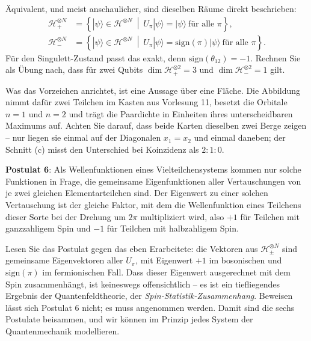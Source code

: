 Äquivalent, und meist anschaulicher, sind dieselben Räume direkt beschrieben:
\begin{align}
  \mathcal{H}^{\otimes N}_{+} &= \left\{|\psi\rangle \in \mathcal{H}^{\otimes N}\ \middle|\ U_\pi|\psi\rangle = |\psi\rangle\ \text{für alle $\pi$}\right\},\\
  \mathcal{H}^{\otimes N}_{-} &= \left\{|\psi\rangle \in \mathcal{H}^{\otimes N}\ \middle|\ U_\pi|\psi\rangle = \text{sign}(\pi)|\psi\rangle\ \text{für alle $\pi$}\right\}.
\end{align}
Für den Singulett-Zustand passt das exakt, denn $\text{sign}(\theta_{12}) = -1$. Rechnen Sie als Übung nach, dass für zwei Qubits $\dim \mathcal{H}^{\otimes 2}_{+} = 3$ und $\dim \mathcal{H}^{\otimes 2}_{-} = 1$ gilt.

Was das Vorzeichen anrichtet, ist eine Aussage über eine Fläche. Die Abbildung nimmt dafür zwei Teilchen im Kasten aus Vorlesung 11, besetzt die Orbitale $n=1$ und $n=2$ und trägt die Paardichte in Einheiten ihres unterscheidbaren Maximums auf. Achten Sie darauf, dass beide Karten dieselben zwei Berge zeigen -- nur liegen sie einmal auf der Diagonalen $x_1=x_2$ und einmal daneben; der Schnitt (c) misst den Unterschied bei Koinzidenz als $2:1:0$.



\begin{center}
\parbox[c][5cm][c]{14cm}{\begin{tcolorbox}[colback=banana,arc=0cm,frame hidden,enhanced]{\textbf{Postulat 6}: Als Wellenfunktionen eines Vielteilchensystems kommen nur solche Funktionen in Frage, die gemeinsame Eigenfunktionen aller Vertauschungen von je zwei gleichen Elementarteilchen sind. Der Eigenwert zu einer solchen Vertauschung ist
der gleiche Faktor, mit dem die Wellenfunktion eines Teilchens dieser Sorte bei der Drehung um $2\pi$ multipliziert wird, also $+1$ für Teilchen mit ganzzahligem Spin und $-1$ für Teilchen mit halbzahligem Spin.}\end{tcolorbox}}
\end{center}

Lesen Sie das Postulat gegen das eben Erarbeitete: die Vektoren aus $\mathcal{H}^{\otimes N}_{\pm}$ sind gemeinsame Eigenvektoren aller $U_\pi$, mit Eigenwert $+1$ im bosonischen und $\text{sign}(\pi)$ im fermionischen Fall. Dass dieser Eigenwert ausgerechnet mit dem Spin zusammenhängt, ist keineswegs offensichtlich -- es ist ein tiefliegendes Ergebnis der Quantenfeldtheorie, der \emph{Spin-Statistik-Zusammenhang}. Beweisen lässt sich Postulat 6 nicht; es muss angenommen werden. Damit sind die sechs Postulate beisammen, und wir können im Prinzip jedes System der Quantenmechanik modellieren.

